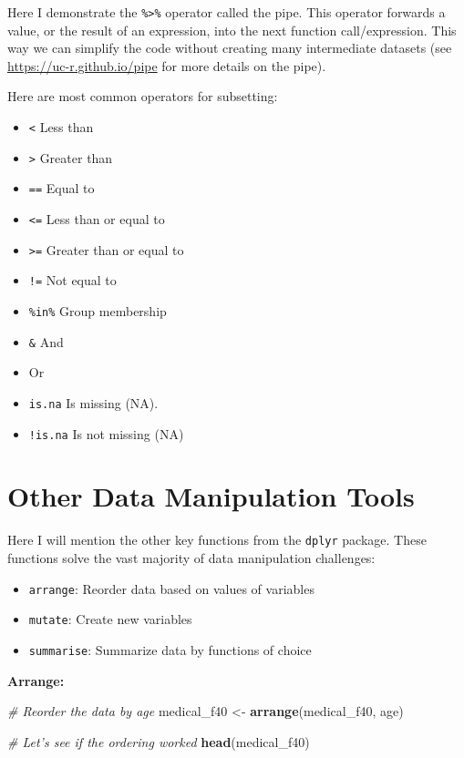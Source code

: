 \documentclass[]{book}
\newenvironment{Shaded}{\begin{snugshade}}{\end{snugshade}}
\newcommand{\CommentTok}[1]{\textcolor[rgb]{0.56,0.35,0.01}{\textit{#1}}}
\newcommand{\KeywordTok}[1]{\textcolor[rgb]{0.13,0.29,0.53}{\textbf{#1}}}
\newcommand{\NormalTok}[1]{#1}
\newcommand{\StringTok}[1]{\textcolor[rgb]{0.31,0.60,0.02}{#1}}
\providecommand{\tightlist}{%
  \setlength{\itemsep}{0pt}\setlength{\parskip}{0pt}}
\begin{document}
Here I demonstrate the \texttt{\%\textgreater{}\%} operator called the pipe. This operator forwards a value, or the result of an expression, into the next function call/expression. This way we can simplify the code without creating many intermediate datasets (see \url{https://uc-r.github.io/pipe} for more details on the pipe).

Here are most common operators for subsetting:

\begin{itemize}
\tightlist
\item
  \texttt{\textless{}} Less than
\item
  \texttt{\textgreater{}} Greater than
\item
  \texttt{==} Equal to
\item
  \texttt{\textless{}=} Less than or equal to
\item
  \texttt{\textgreater{}=} Greater than or equal to
\item
  \texttt{!=} Not equal to
\item
  \texttt{\%in\%} Group membership
\item
  \texttt{\&} And
\item
  \texttt{\textbar{}} Or
\item
  \texttt{is.na} Is missing (NA).
\item
  \texttt{!is.na} Is not missing (NA)
\end{itemize}

\hypertarget{other-data-manipulation-tools}{%
\section{Other Data Manipulation Tools}\label{other-data-manipulation-tools}}

Here I will mention the other key functions from the \texttt{dplyr} package. These functions solve the vast majority of data manipulation challenges:

\begin{itemize}
\tightlist
\item
  \texttt{arrange}: Reorder data based on values of variables
\item
  \texttt{mutate}: Create new variables
\item
  \texttt{summarise}: Summarize data by functions of choice
\end{itemize}

\textbf{Arrange:}

\begin{Shaded}
\begin{Highlighting}[]
\CommentTok{# Reorder the data by age}
\NormalTok{medical_f40 <-}\StringTok{ }\KeywordTok{arrange}\NormalTok{(medical_f40, age)}

\CommentTok{# Let's see if the ordering worked}
\KeywordTok{head}\NormalTok{(medical_f40)}
\end{Highlighting}
\end{Shaded}
\end{document}

